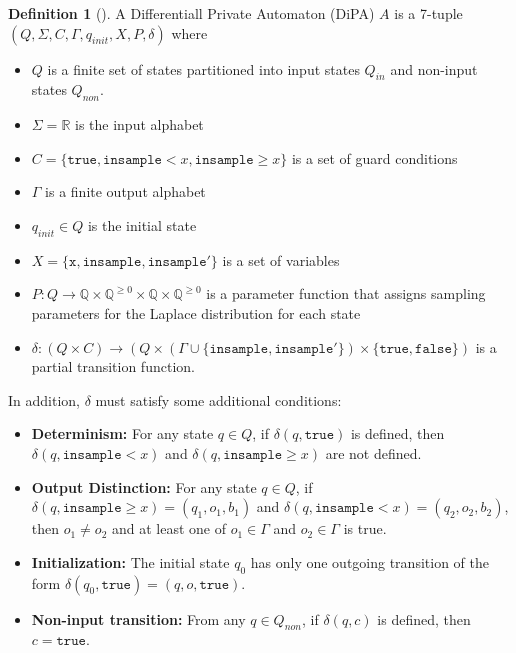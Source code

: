 \documentclass[12pt]{article}
\newcommand{\QQ}{\mathbb{Q}}
\newcommand{\RR}{\mathbb{R}}
\newcommand{\gguard}[1][x]{\texttt{insample}\geq #1}
\newcommand{\lguard}[1][x]{\texttt{insample} < #1}
\theoremstyle{definition}
\newtheorem{defn}[thm]{Definition}
\begin{document}
\begin{defn}[\cite{chadhaLinearTimeDecidability2021}]
    A Differentiall Private Automaton (DiPA) $A$ is a 7-tuple $(Q, \Sigma, C, \Gamma, q_{init}, X, P, \delta)$ where
    \begin{itemize}
        \item $Q$ is a finite set of states partitioned into input states $Q_{in}$ and non-input states $Q_{non}$. 
        \item $\Sigma = \RR$ is the input alphabet
        \item $C = \{\texttt{true}, \lguard, \gguard\}$ is a set of guard conditions
        \item $\Gamma$ is a finite output alphabet
        \item $q_{init}\in Q$ is the initial state
        \item $X = \{\texttt{x}, \texttt{insample}, \texttt{insample}'\}$ is a set of variables
        \item $P: Q\to \QQ\times \QQ^{\geq 0}\times \QQ\times  \QQ^{\geq 0}$ is a parameter function that assigns sampling parameters for the Laplace distribution for each state
        \item $\delta:(Q\times C)\to (Q\times (\Gamma \cup \{\texttt{insample}, \texttt{insample}'\})\times \{\texttt{true}, \texttt{false}\})$ is a partial transition function. 
    \end{itemize}
    In addition, $\delta$ must satisfy some additional conditions:
    \begin{itemize}
        \item \textbf{Determinism:} For any state $q\in Q$, if $\delta(q,\texttt{true})$ is defined, then $\delta(q,\lguard)$ and $\delta(q,\gguard)$ are not defined. 

        \item \textbf{Output Distinction:} For any state $q\in Q$, if $\delta(q, \gguard) = (q_1, o_1, b_1)$ and $\delta(q, \lguard) = (q_2, o_2, b_2)$, then $o_1\neq o_2$ and at least one of $o_1\in \Gamma$ and $o_2\in \Gamma$ is true.

        \item \textbf{Initialization:} The initial state $q_0$ has only one outgoing transition of the form $\delta(q_0, \texttt{true}) = (q, o, \texttt{true})$.

        \item \textbf{Non-input transition:} From any $q\in Q_{non}$, if $\delta(q, c)$ is defined, then $c=\texttt{true}$.
    \end{itemize}
\end{defn}
\end{document}
